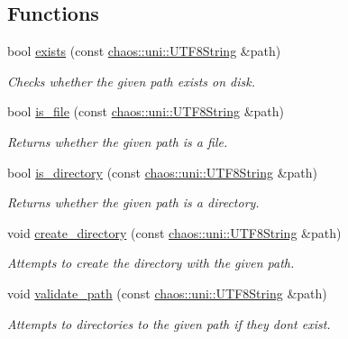 \subsection*{Functions}
\begin{DoxyCompactItemize}
\item 
bool \hyperlink{namespacechaos_1_1io_1_1file_a30e2d7207df6af04322b7f9e11674825}{exists} (const \hyperlink{classchaos_1_1uni_1_1_u_t_f8_string}{chaos\+::uni\+::\+U\+T\+F8\+String} \&path)
\begin{DoxyCompactList}\small\item\em Checks whether the given path exists on disk. \end{DoxyCompactList}\item 
bool \hyperlink{namespacechaos_1_1io_1_1file_a310de03ae6c868be8379dc49fe45ea4d}{is\+\_\+file} (const \hyperlink{classchaos_1_1uni_1_1_u_t_f8_string}{chaos\+::uni\+::\+U\+T\+F8\+String} \&path)
\begin{DoxyCompactList}\small\item\em Returns whether the given path is a file. \end{DoxyCompactList}\item 
bool \hyperlink{namespacechaos_1_1io_1_1file_ad9890ac8b9dcf3c948274222995c3ea0}{is\+\_\+directory} (const \hyperlink{classchaos_1_1uni_1_1_u_t_f8_string}{chaos\+::uni\+::\+U\+T\+F8\+String} \&path)
\begin{DoxyCompactList}\small\item\em Returns whether the given path is a directory. \end{DoxyCompactList}\item 
\hypertarget{namespacechaos_1_1io_1_1file_a9d0395c776184dc23973584a80a86d89}{}void \hyperlink{namespacechaos_1_1io_1_1file_a9d0395c776184dc23973584a80a86d89}{create\+\_\+directory} (const \hyperlink{classchaos_1_1uni_1_1_u_t_f8_string}{chaos\+::uni\+::\+U\+T\+F8\+String} \&path)\label{namespacechaos_1_1io_1_1file_a9d0395c776184dc23973584a80a86d89}

\begin{DoxyCompactList}\small\item\em Attempts to create the directory with the given path. \end{DoxyCompactList}\item 
void \hyperlink{namespacechaos_1_1io_1_1file_a85365416303132fc0e8691af65fdcf41}{validate\+\_\+path} (const \hyperlink{classchaos_1_1uni_1_1_u_t_f8_string}{chaos\+::uni\+::\+U\+T\+F8\+String} \&path)
\begin{DoxyCompactList}\small\item\em Attempts to directories to the given path if they don\textquotesingle{}t exist. \end{DoxyCompactList}\end{DoxyCompactItemize}


